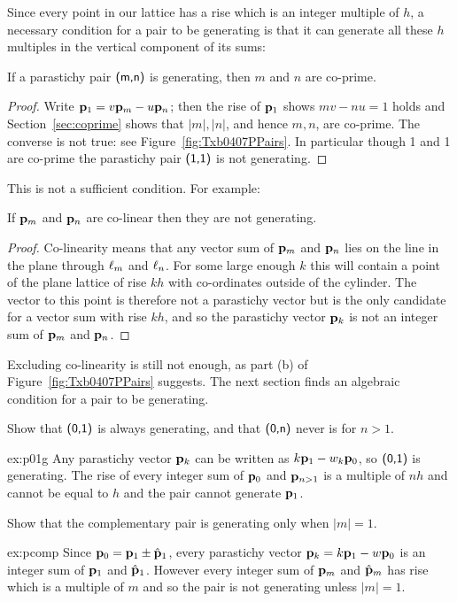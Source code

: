 Since every point in our lattice has a rise which is an integer multiple of $h$, a necessary condition for a pair to be generating is that it can generate all these $h$ multiples in the vertical component of its sums:
\begin{theorem}
	\label{thm:coprime1}
	If a parastichy pair $\textsf{(m,n)}$ is generating, then $m$ and $n$ are co-prime. 
\end{theorem}
\begin{proof}
	Write ${\mathbf p}_{1}= v{\mathbf p}_{m}-u{\mathbf p}_{n}$; then the rise of ${\mathbf p}_{1}$ shows $mv-nu = 1$ holds and Section~\ref{sec:coprime} shows that $|m|,|n|$, and hence $m,n$, are co-prime. The converse is not true: see Figure~\ref{fig:Txb0407PPairs}. In particular though 1 and 1 are co-prime the parastichy pair $\textsf{(1,1)}$ is not generating.
\end{proof}
This is not a sufficient condition. For example:
\begin{theorem}
	\label{thm:coprime}
	If ${\mathbf p}_{m}$ and ${\mathbf p}_{n}$ are co-linear then they are not generating.
\end{theorem}
\begin{proof}
	Co-linearity means that any vector sum of ${\mathbf p}_{m}$ and ${\mathbf p}_{n}$ lies on the line in the plane through $\ell_{{m}}$ and $\ell_{{n}}$. For some large enough $k$ this will contain a point of the plane lattice of rise $kh$ with co-ordinates outside of the cylinder. The vector to this point is therefore not a parastichy vector but is the only candidate for a vector sum with rise $kh$, and so the parastichy vector ${\mathbf p}_{k}$ is not an integer sum of ${\mathbf p}_{m}$ and ${\mathbf p}_{n}$.
\end{proof}
Excluding co-linearity is still not enough, as part (b) of Figure~\ref{fig:Txb0407PPairs} suggests. The next section finds an algebraic condition for a pair to be generating. 

\begin{jExercise}\label{ex:p01g}
	\label{ex:01generating}
	Show that $\textsf{(0,1)}$ is always generating, and that  $\textsf{(0,n)}$ never is for $n>1$. 
\end{jExercise}
\begin{jAnswer}{ex:p01g}{
	Any parastichy vector ${\mathbf p}_{k}$ can be written as $k{\mathbf p}_{1}-w_k {\mathbf p}_{0}$, so $\textsf{(0,1)}$ is generating. The rise of every integer sum of ${\mathbf p}_{0}$ and ${\mathbf p}_{n>1}$ is a multiple of $nh$ and cannot be equal to $h$ and the pair cannot generate ${\mathbf p}_{1}$.
}
\end{jAnswer}
\begin{jExercise}\label{ex:pcomp}
	Show that the complementary pair  is generating only when $|m|=1$.
\end{jExercise}
\begin{jAnswer}{ex:pcomp}{
	Since ${\mathbf p}_{0}={\mathbf p}_{1}\pm\hat{\mathbf p}_{1}$, every parastichy vector ${\mathbf p}_{k}=k{\mathbf p}_{1}-w{\mathbf p}_{0}$ is an integer sum of ${\mathbf p}_{1}$ and $\hat{\mathbf p}_{1}$. However every integer sum of
	${\mathbf p}_{m}$ and $\hat{\mathbf p}_{m}$ has rise which is a multiple of $m$ and so the pair is not generating unless $|m|=1$. 
}\end{jAnswer}



